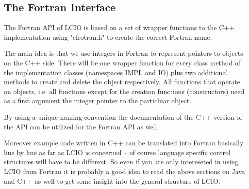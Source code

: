 %
%
\subsection{The Fortran Interface} \label{f77api}

The Fortran API of LCIO is based on a set of wrapper functions to the 
C++ implementation using "cfrotran.h" to create the correct Fortran name.

The main idea is that we use integers in Fortran to represent pointers to 
objects on the C++ side. There will be one wrapper function for every class method
of the implementation classes (namespaces IMPL and IO) plus two additional methods 
to create and delete the object respectively. All functions that operate on objects, i.e.
all functions except for the creation functions (constructors) need as a first argument 
the integer pointer to the particluar object.

By using a unique naming convention the documentation of the C++ version of the API
can be utilized for the Fortran API as well.

Moreover example code written in C++ can be translated into Fortran basically line by 
line as far as LCIO is concerned -- of course language specific control structures 
will have to be different. So even if you are only intereseted in using LCIO from Fortran 
it is probably a good idea to read the above sections on Java and C++ as well to get some 
insight into the general structure of LCIO.

